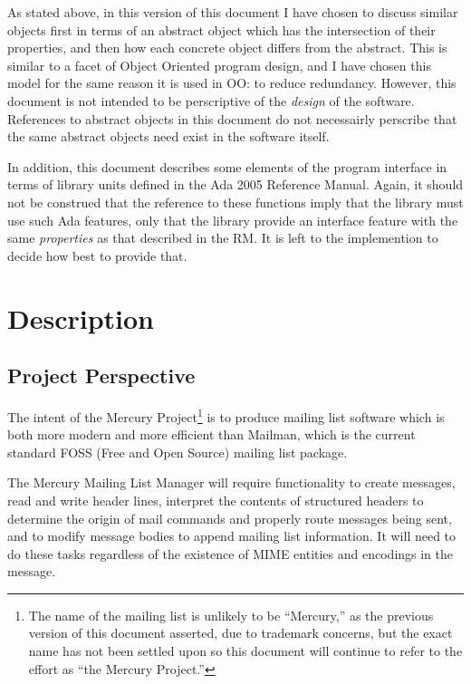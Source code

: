 \documentclass[11pt]{article}
\begin{document}
As stated above, in this version of this document I have chosen to
discuss similar objects first in terms of an abstract object which has
the intersection of their properties, and then how each concrete
object differs from the abstract. This is similar to a facet of Object
Oriented program design, and I have chosen this model for the same
reason it is used in OO: to reduce redundancy. However, this document
is not intended to be perscriptive of the \emph{design} of the
software. References to abstract objects in this document do not
necessairly perscribe that the same abstract objects need exist in the
software itself.

In addition, this document describes some elements of the program
interface in terms of library units defined in the Ada 2005 Reference
Manual. Again, it should not be construed that the reference to these
functions imply that the library must use such Ada features, only that
the library provide an interface feature with the same
\emph{properties} as that described in the RM. It is left to the
implemention to decide how best to provide that.

\section{Description}
\label{description}



\subsection{Project Perspective}

The intent of the Mercury Project\footnote{The name of the mailing
  list is unlikely to be ``Mercury,'' as the previous version of this
  document asserted, due to trademark concerns, but the exact name has
  not been settled upon so this document will continue to refer to the
  effort as ``the Mercury Project.''} is to produce mailing list
software which is both more modern and more efficient than Mailman,
which is the current standard FOSS (Free and Open Source) mailing list
package.

The Mercury Mailing List Manager will require functionality to create
messages, read and write header lines, interpret the contents of
structured headers to determine the origin of mail commands and
properly route messages being sent, and to modify message bodies to
append mailing list information. It will need to do these tasks
regardless of the existence of MIME entities and encodings in the
message.
\end{document}
